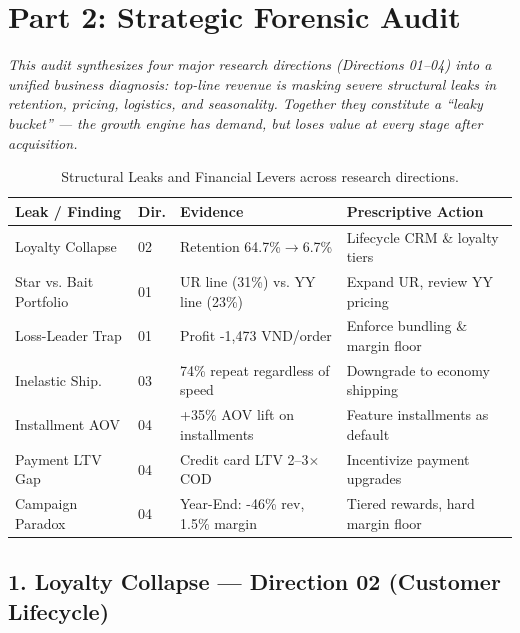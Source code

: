 \section{Part 2: Strategic Forensic Audit}

\textit{This audit synthesizes four major research directions (Directions 01--04) into a unified business diagnosis: top-line revenue is masking severe structural leaks in retention, pricing, logistics, and seasonality. Together they constitute a ``leaky bucket'' — the growth engine has demand, but loses value at every stage after acquisition.}

\begin{table}[!htbp]
\centering
\small
\begin{tabular}{@{}lllp{4.6cm}@{}}
\toprule
\textbf{Leak / Finding} & \textbf{Dir.} & \textbf{Evidence} & \textbf{Prescriptive Action} \\
\midrule
Loyalty Collapse  & 02 & Retention 64.7\%$\rightarrow$6.7\%   & Lifecycle CRM \& loyalty tiers \\
Star vs. Bait Portfolio & 01 & UR line (31\%) vs. YY line (23\%)  & Expand UR, review YY pricing \\
Loss-Leader Trap  & 01 & Profit -1{,}473 VND/order             & Enforce bundling \& margin floor \\
Inelastic Ship.   & 03 & 74\% repeat regardless of speed       & Downgrade to economy shipping \\
Installment AOV   & 04 & +35\% AOV lift on installments        & Feature installments as default \\
Payment LTV Gap   & 04 & Credit card LTV 2--3$\times$ COD        & Incentivize payment upgrades \\
Campaign Paradox  & 04 & Year-End: -46\% rev, 1.5\% margin    & Tiered rewards, hard margin floor \\
\bottomrule
\end{tabular}
\caption{Structural Leaks and Financial Levers across research directions.}
\label{tab:part2_leaks}
\vspace{-0.4cm}
\end{table}

\subsection{1. Loyalty Collapse — Direction 02 (Customer Lifecycle)}

